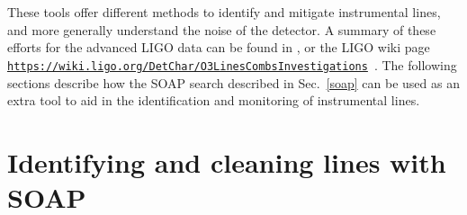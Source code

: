 These tools offer different methods to identify and mitigate instrumental lines, and more generally understand the noise of the detector. A summary of these efforts for
the advanced \gls{LIGO} data can be found in
\citep{covas2018IdentificationMitigation}, or the \gls{LIGO} wiki page {\tt
\url{https://wiki.ligo.org/DetChar/O3LinesCombsInvestigations}}~. The following
sections describe how the SOAP search described in Sec.~\ref{soap} can be used
as an extra tool to aid in the identification and monitoring of instrumental
lines.

\clearpage

\section{\label{detchar:soap}Identifying and cleaning lines with SOAP}

